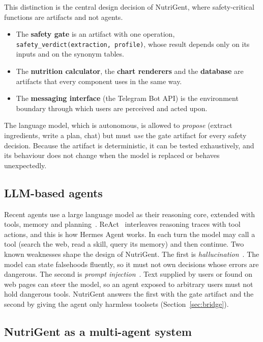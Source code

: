 \documentclass[11pt,a4paper]{article}
\begin{document}
This distinction is the central design decision of NutriGent, where safety-critical functions are
artifacts and not agents.

\begin{itemize}
  \item The \textbf{safety gate} is an artifact with one operation,
        \texttt{safety\_verdict(extraction, profile)}, whose result depends only on its inputs and on
        the synonym tables.
  \item The \textbf{nutrition calculator}, the \textbf{chart renderers} and the \textbf{database} are
        artifacts that every component uses in the same way.
  \item The \textbf{messaging interface} (the Telegram Bot API) is the environment boundary through
        which users are perceived and acted upon.
\end{itemize}

The language model, which is autonomous, is allowed to \emph{propose} (extract ingredients, write a
plan, chat) but must \emph{use} the gate artifact for every safety decision. Because the artifact is
deterministic, it can be tested exhaustively, and its behaviour does not change when the model is
replaced or behaves unexpectedly.

\subsection{LLM-based agents}

Recent agents use a large language model as their reasoning core, extended with tools, memory and
planning~\cite{wang2024survey}. ReAct~\cite{yao2023react} interleaves reasoning traces with tool actions,
and this is how Hermes Agent works. In each turn the model may call a tool (search the web, read a
skill, query its memory) and then continue. Two known weaknesses shape the design of NutriGent. The
first is \emph{hallucination}~\cite{ji2023hallucination}. The model can state falsehoods fluently, so
it must not own decisions whose errors are dangerous. The second is \emph{prompt
injection}~\cite{greshake2023}. Text supplied by users or found on web pages can steer the model, so
an agent exposed to arbitrary users must not hold dangerous tools. NutriGent answers the first with the
gate artifact and the second by giving the agent only harmless toolsets (Section~\ref{sec:bridge}).

\subsection{NutriGent as a multi-agent system}
\end{document}
